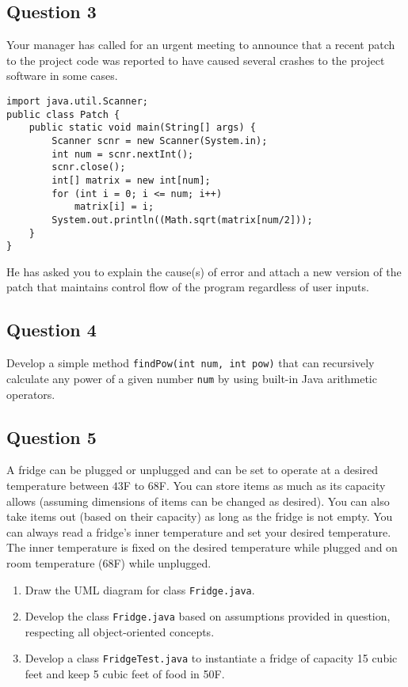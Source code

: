 \documentclass[12pt,letterpaper,twoside]{article}
\begin{document}
\newpage

\subsection*{Question 3}

Your manager has called for an urgent meeting to announce that a recent patch to the project code was reported to have caused several crashes to the project software in some cases.

\begin{lstlisting}
import java.util.Scanner;
public class Patch {
	public static void main(String[] args) {
		Scanner scnr = new Scanner(System.in);
		int num = scnr.nextInt();
		scnr.close();
		int[] matrix = new int[num];
		for (int i = 0; i <= num; i++)
			matrix[i] = i;
		System.out.println((Math.sqrt(matrix[num/2]));
	}
}
\end{lstlisting}

He has asked you to explain the cause(s) of error and attach a new version of the patch that maintains control flow of the program regardless of user inputs.

\newpage

\subsection*{Question 4}

Develop a simple method \texttt{findPow(int num, int pow)} that can recursively calculate any power of a given number \texttt{num} by using built-in Java arithmetic operators.

\newpage

\subsection*{Question 5}

A fridge can be plugged or unplugged and can be set to operate at a desired temperature between $43$F to $68$F. You can store items as much as its capacity allows (assuming dimensions of items can be changed as desired). You can also take items out (based on their capacity) as long as the fridge is not empty.
You can always read a fridge's inner temperature and set your desired temperature. The inner temperature is fixed on the desired temperature while plugged and on room temperature (68F) while unplugged.

\begin{enumerate}[label=(\alph*)]
	\item Draw the UML diagram for class \texttt{Fridge.java}.
	\item Develop the class \texttt{Fridge.java} based on assumptions provided in question, respecting all object-oriented concepts.
	\item Develop a class \texttt{FridgeTest.java} to instantiate a fridge of capacity 15 cubic feet and keep 5 cubic feet of food in 50F.
\end{enumerate}
\end{document}

